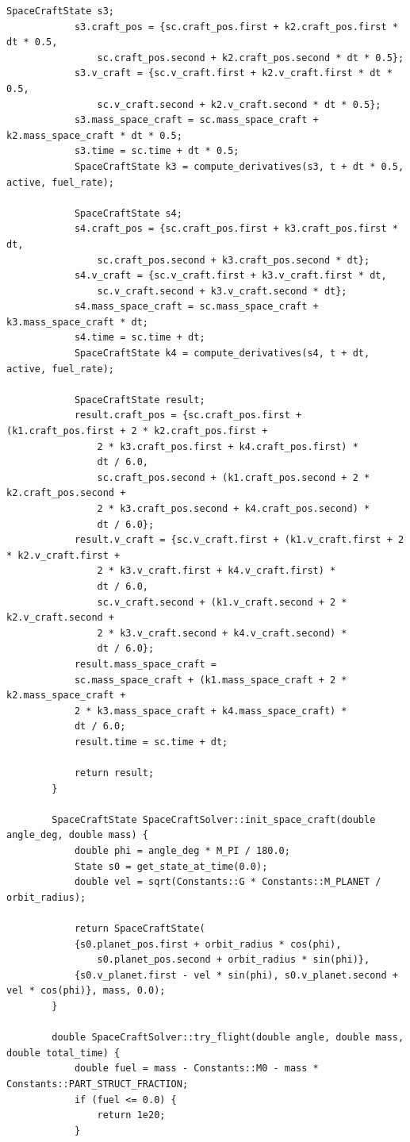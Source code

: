 \documentclass[14pt,a4paper]{extarticle}
\theoremstyle{plain}
\begin{document}
\begin{lstlisting}[title=spacecraftSolver.cpp, gobble=16, breaklines=true, breakatwhitespace=true]
			SpaceCraftState s3;
			s3.craft_pos = {sc.craft_pos.first + k2.craft_pos.first * dt * 0.5,
				sc.craft_pos.second + k2.craft_pos.second * dt * 0.5};
			s3.v_craft = {sc.v_craft.first + k2.v_craft.first * dt * 0.5,
				sc.v_craft.second + k2.v_craft.second * dt * 0.5};
			s3.mass_space_craft = sc.mass_space_craft + k2.mass_space_craft * dt * 0.5;
			s3.time = sc.time + dt * 0.5;
			SpaceCraftState k3 = compute_derivatives(s3, t + dt * 0.5, active, fuel_rate);
			
			SpaceCraftState s4;
			s4.craft_pos = {sc.craft_pos.first + k3.craft_pos.first * dt,
				sc.craft_pos.second + k3.craft_pos.second * dt};
			s4.v_craft = {sc.v_craft.first + k3.v_craft.first * dt,
				sc.v_craft.second + k3.v_craft.second * dt};
			s4.mass_space_craft = sc.mass_space_craft + k3.mass_space_craft * dt;
			s4.time = sc.time + dt;
			SpaceCraftState k4 = compute_derivatives(s4, t + dt, active, fuel_rate);
			
			SpaceCraftState result;
			result.craft_pos = {sc.craft_pos.first + (k1.craft_pos.first + 2 * k2.craft_pos.first +
				2 * k3.craft_pos.first + k4.craft_pos.first) *
				dt / 6.0,
				sc.craft_pos.second + (k1.craft_pos.second + 2 * k2.craft_pos.second +
				2 * k3.craft_pos.second + k4.craft_pos.second) *
				dt / 6.0};
			result.v_craft = {sc.v_craft.first + (k1.v_craft.first + 2 * k2.v_craft.first +
				2 * k3.v_craft.first + k4.v_craft.first) *
				dt / 6.0,
				sc.v_craft.second + (k1.v_craft.second + 2 * k2.v_craft.second +
				2 * k3.v_craft.second + k4.v_craft.second) *
				dt / 6.0};
			result.mass_space_craft =
			sc.mass_space_craft + (k1.mass_space_craft + 2 * k2.mass_space_craft +
			2 * k3.mass_space_craft + k4.mass_space_craft) *
			dt / 6.0;
			result.time = sc.time + dt;
			
			return result;
		}
		
		SpaceCraftState SpaceCraftSolver::init_space_craft(double angle_deg, double mass) {
			double phi = angle_deg * M_PI / 180.0;
			State s0 = get_state_at_time(0.0);
			double vel = sqrt(Constants::G * Constants::M_PLANET / orbit_radius);
			
			return SpaceCraftState(
			{s0.planet_pos.first + orbit_radius * cos(phi),
				s0.planet_pos.second + orbit_radius * sin(phi)},
			{s0.v_planet.first - vel * sin(phi), s0.v_planet.second + vel * cos(phi)}, mass, 0.0);
		}
		
		double SpaceCraftSolver::try_flight(double angle, double mass, double total_time) {
			double fuel = mass - Constants::M0 - mass * Constants::PART_STRUCT_FRACTION;
			if (fuel <= 0.0) {
				return 1e20;
			}
			

\end{lstlisting}
\end{document}
